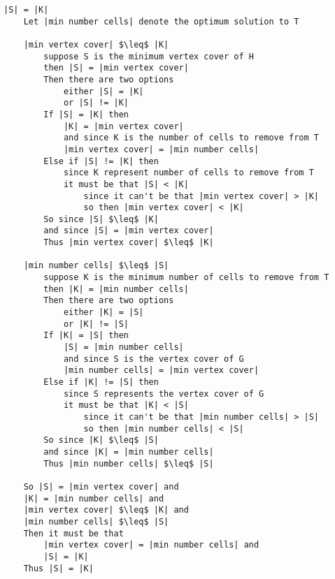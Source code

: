 \documentclass[11pt]{article}
\begin{document}
\begin{lstlisting}[basicstyle=\small, mathescape=true]
|S| = |K|
	Let |min number cells| denote the optimum solution to T

	|min vertex cover| $\leq$ |K|
		suppose S is the minimum vertex cover of H
		then |S| = |min vertex cover|
		Then there are two options
			either |S| = |K|
			or |S| != |K|
		If |S| = |K| then
			|K| = |min vertex cover|
			and since K is the number of cells to remove from T
			|min vertex cover| = |min number cells|
		Else if |S| != |K| then
			since K represent number of cells to remove from T
			it must be that |S| < |K|
				since it can't be that |min vertex cover| > |K|
				so then |min vertex cover| < |K|
		So since |S| $\leq$ |K|
		and since |S| = |min vertex cover|
		Thus |min vertex cover| $\leq$ |K|
	
	|min number cells| $\leq$ |S|
		suppose K is the minimum number of cells to remove from T
		then |K| = |min number cells|
		Then there are two options
			either |K| = |S|
			or |K| != |S|
		If |K| = |S| then
			|S| = |min number cells|
			and since S is the vertex cover of G
			|min number cells| = |min vertex cover|
		Else if |K| != |S| then
			since S represents the vertex cover of G
			it must be that |K| < |S|
				since it can't be that |min number cells| > |S|
				so then |min number cells| < |S|
		So since |K| $\leq$ |S|
		and since |K| = |min number cells|
		Thus |min number cells| $\leq$ |S|
	
	So |S| = |min vertex cover| and
	|K| = |min number cells| and
	|min vertex cover| $\leq$ |K| and 
	|min number cells| $\leq$ |S|
	Then it must be that
		|min vertex cover| = |min number cells| and
		|S| = |K|
	Thus |S| = |K|
\end{lstlisting}
\end{document}
